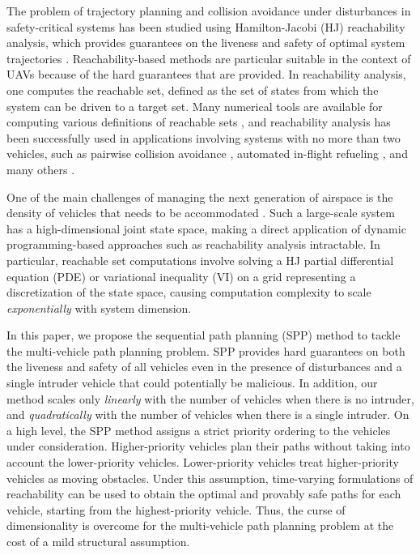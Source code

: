 The problem of trajectory planning and collision avoidance under disturbances in safety-critical systems has been studied using Hamilton-Jacobi (HJ) reachability analysis, which provides guarantees on the liveness and safety of optimal system trajectories \cite{Barron90, Mitchell05, Bokanowski10, Bokanowski11, Margellos11, Fisac15}. Reachability-based methods are particular suitable in the context of UAVs because of the hard guarantees that are provided. In reachability analysis, one computes the reachable set, defined as the set of states from which the system can be driven to a target set. Many numerical tools are available for computing various definitions of reachable sets \cite{Sethian96, Osher02, Mitchell02, Mitchell07}, and reachability analysis has been successfully used in applications involving systems with no more than two vehicles, such as pairwise collision avoidance \cite{Mitchell05}, automated in-flight refueling \cite{Ding08}, and many others \cite{Huang11, Bayen07}.

One of the main challenges of managing the next generation of airspace is the density of vehicles that needs to be accommodated \cite{Kopardekar16}. Such a large-scale system has a high-dimensional joint state space, making a direct application of dynamic programming-based approaches such as reachability analysis intractable. In particular, reachable set computations involve solving a HJ partial differential equation (PDE) or variational inequality (VI) on a grid representing a discretization of the state space, causing computation complexity to scale \textit{exponentially} with system dimension.

In this paper, we propose the sequential path planning (SPP) method to tackle the multi-vehicle path planning problem. SPP provides hard guarantees on both the liveness and safety of all vehicles even in the presence of disturbances and a single intruder vehicle that could potentially be malicious. In addition, our method scales only \textit{linearly} with the number of vehicles when there is no intruder, and \textit{quadratically} with the number of vehicles when there is a single intruder. On a high level, the SPP method assigns a strict priority ordering to the vehicles under consideration. Higher-priority vehicles plan their paths without taking into account the lower-priority vehicles. Lower-priority vehicles treat higher-priority vehicles as moving obstacles. Under this assumption, time-varying formulations of reachability \cite{Bokanowski11, Fisac15} can be used to obtain the optimal and provably safe paths for each vehicle, starting from the highest-priority vehicle. Thus, the curse of dimensionality is overcome for the multi-vehicle path planning problem at the cost of a mild structural assumption. 

